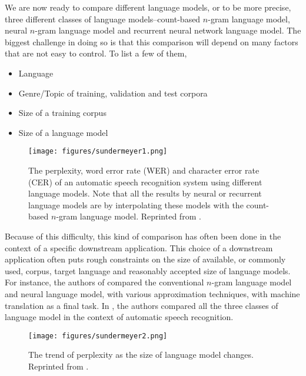 \documentclass{report}
\begin{document}
We are now ready to compare different language models, or to be more precise,
three different classes of language models--count-based $n$-gram language model,
neural $n$-gram language model and recurrent neural network language model. The
biggest challenge in doing so is that this comparison will depend on many
factors that are not easy to control. To list a few of them,
\begin{itemize}
    \itemsep 0em
    \item Language
    \item Genre/Topic of training, validation and test corpora
    \item Size of a training corpus
    \item Size of a language model
\end{itemize}

\begin{figure}[ht]
    \centering
    \texttt{[image: figures/sundermeyer1.png]}

    \caption{
        The perplexity, word error rate (WER) and character error rate (CER) of
        an automatic speech recognition system using different language models.
        Note that all the results by neural or recurrent language models are by
        interpolating these models with the count-based $n$-gram language model.
        Reprinted from \cite{sundermeyer2015feedforward}.
    }
    \label{fig:sundermeyer1}
\end{figure}

Because of this difficulty, this kind of comparison has often been done in the
context of a specific downstream application. This choice of a downstream
application often puts rough constraints on the size of available, or commonly
used, corpus, target language and reasonably accepted size of language models.
For instance, the authors of \cite{baltescu2014pragmatic} compared the
conventional $n$-gram language model and neural language model, with various
approximation techniques, with machine translation as a final task. In
\cite{sundermeyer2015feedforward}, the authors compared all the three classes of
language model in the context of automatic speech recognition.

\begin{figure}[ht]
    \centering
    \texttt{[image: figures/sundermeyer2.png]}

    \caption{
        The trend of perplexity as the size of language model changes.
        Reprinted from \cite{sundermeyer2015feedforward}.
    }
    \label{fig:sundermeyer2}
\end{figure}
\end{document}
